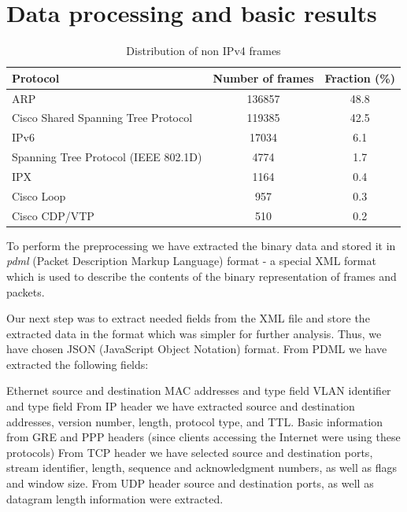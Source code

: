 \section{Data processing and basic results}
\label{section:results}

\begin{table}[h!]
  \caption{Distribution of non IPv4 frames}
  \label{tab:non:ipv4:frames}
  \centering
  \begin{tabular}{lcc}
    \hline
    {\bf Protocol}                                   & {\bf Number of frames } & {\bf Fraction (\%)} \\
    \hline
    ARP                                              & 136857                  & 48.8 \\
    Cisco Shared Spanning Tree Protocol              & 119385                  & 42.5 \\    
    IPv6                                             & 17034                   & 6.1  \\
    Spanning Tree Protocol (IEEE 802.1D)             & 4774                    & 1.7  \\
    IPX                                              & 1164                    & 0.4  \\
    Cisco Loop                                       & 957                     & 0.3  \\
    Cisco CDP/VTP                                    & 510                     & 0.2  \\
  \end{tabular}
\end{table}



To perform the preprocessing we have extracted the binary data
and stored it in {\em pdml} (Packet Description Markup Language) 
format - a special XML format which is used to describe the 
contents of the binary representation of frames and packets.

Our next step was to extract needed fields from the XML 
file and store the extracted data in the format which was 
simpler for further analysis. Thus, we have chosen 
JSON (JavaScript Object Notation) format. From PDML
we have extracted the following fields:

\bi
  \im Ethernet source and destination MAC addresses and type field
  \im VLAN identifier and type field
  \im From IP header we have extracted source and destination 
      addresses, version number, length, protocol type, and TTL.
  \im Basic information from GRE and PPP headers (since 
      clients accessing the Internet were using these protocols)
  \im From TCP header we have selected source and destination ports, 
      stream identifier, length, sequence and acknowledgment numbers, 
      as well as flags and window size.
  \im From UDP header source and destination ports, as well as datagram 
      length information were extracted.
\ei


